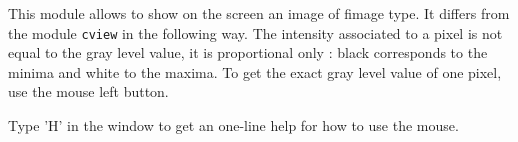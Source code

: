 This module allows to show on the screen an image of fimage type.
It differs from the module \verb+cview+ in the following way.
The intensity associated to a pixel is not equal to the gray level value,
it is proportional only : black corresponds to the minima and white to
the maxima. To get the exact gray level value of one pixel, use the mouse left
button.

Type 'H' in the window to get an one-line help for how to use the mouse.

